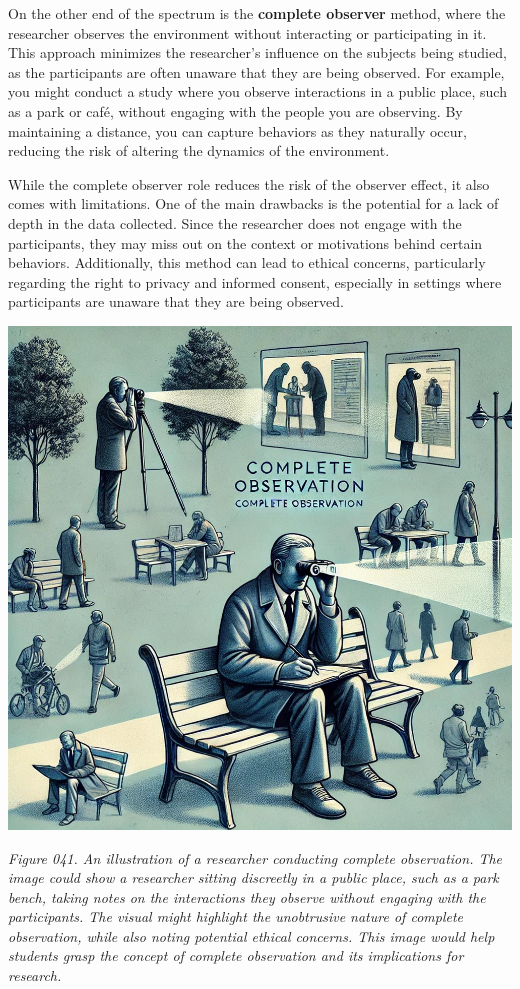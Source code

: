 \documentclass[
]{book}
\begin{document}
On the other end of the spectrum is the \textbf{complete observer} method, where the researcher observes the environment without interacting or participating in it. This approach minimizes the researcher's influence on the subjects being studied, as the participants are often unaware that they are being observed. For example, you might conduct a study where you observe interactions in a public place, such as a park or café, without engaging with the people you are observing. By maintaining a distance, you can capture behaviors as they naturally occur, reducing the risk of altering the dynamics of the environment.

While the complete observer role reduces the risk of the observer effect, it also comes with limitations. One of the main drawbacks is the potential for a lack of depth in the data collected. Since the researcher does not engage with the participants, they may miss out on the context or motivations behind certain behaviors. Additionally, this method can lead to ethical concerns, particularly regarding the right to privacy and informed consent, especially in settings where participants are unaware that they are being observed.

\includegraphics[width=1\textwidth,height=\textheight]{images/fig041.jpg}

\emph{Figure 041. An illustration of a researcher conducting complete observation. The image could show a researcher sitting discreetly in a public place, such as a park bench, taking notes on the interactions they observe without engaging with the participants. The visual might highlight the unobtrusive nature of complete observation, while also noting potential ethical concerns. This image would help students grasp the concept of complete observation and its implications for research.}
\end{document}
